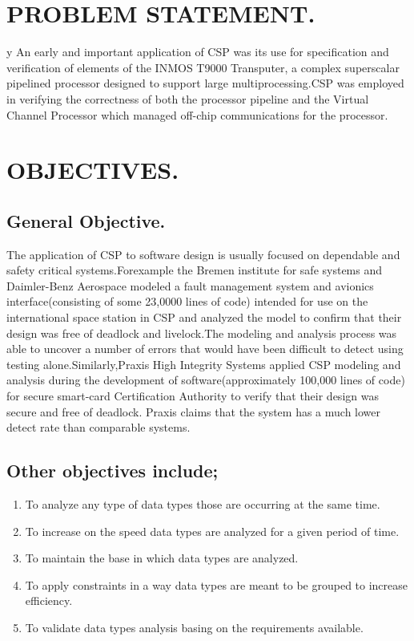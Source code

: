 \documentclass{article}
\begin{document}
\section{PROBLEM STATEMENT.}y
An early and important application of CSP was its use for specification and verification of elements of the INMOS T9000 Transputer, a complex superscalar pipelined processor designed to support large multiprocessing.CSP was employed in verifying the correctness of both the processor pipeline and the Virtual Channel Processor which managed off-chip communications for the processor.

\section{OBJECTIVES.}
\subsection{General Objective.}
The application of CSP to software design is usually focused on dependable and  safety critical systems.Forexample the Bremen institute for safe systems and Daimler-Benz Aerospace modeled a fault management system and avionics interface(consisting of some 23,0000 lines of code) intended for use on the international space station in CSP and analyzed the model to confirm that their design was free of deadlock and livelock.The modeling and analysis process was able to uncover a number of errors that would have been difficult to detect using testing alone.Similarly,Praxis High Integrity Systems applied CSP modeling and analysis during the development of software(approximately 100,000 lines of code) for  secure smart-card Certification Authority to verify that their design was secure and free of deadlock. Praxis claims that the system has a much lower detect rate than comparable systems.
\subsection{Other objectives include;}
\begin{enumerate}
\item To analyze any type of data types those are occurring at the same time.
\item To increase on the speed data types are analyzed for a given period of time.
\item To maintain the base in which data types are analyzed.
\item To apply constraints in a way data types are meant to be grouped to increase efficiency. 
\item To validate data types analysis basing on the requirements available. 
\end{enumerate}
\end{document}
